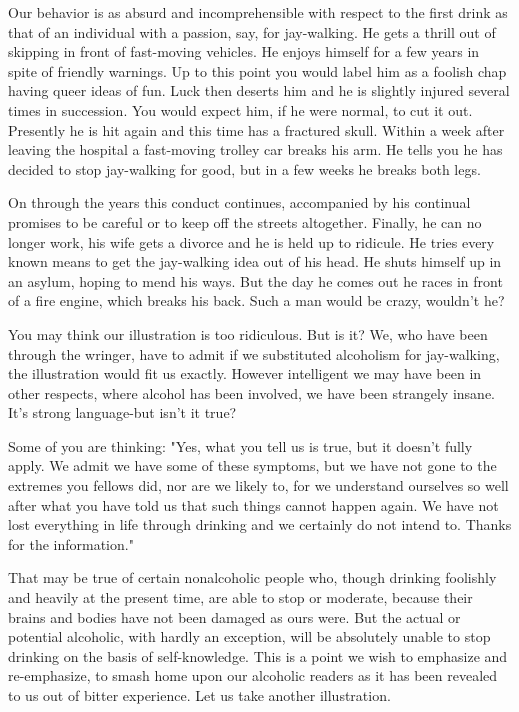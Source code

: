 \begin{biblechapter}
    Our behavior is as absurd and incomprehensible 
    with respect to the first drink 
    as that of an individual with a passion, say, for jay-walking. 
\verse He gets a thrill out of skipping in front of fast-moving vehicles. 
\verse He enjoys himself for a few years in spite of friendly warnings. 
\verse Up to this point you would label him as a foolish chap 
    having queer ideas of fun. 
\verse Luck then deserts him 
    and he is slightly injured several times in succession. 
\verse You would expect him, if he were normal, to cut it out. 
\verse Presently he is hit again and this time has a fractured skull. 
\verse Within a week after leaving the hospital 
    a fast-moving trolley car breaks his arm. 
\verse He tells you he has decided to stop jay-walking for good, 
    but in a few weeks he breaks both legs.

\verse On through the years this conduct continues, 
    accompanied by his continual promises to be careful 
    or to keep off the streets altogether. 
\verse Finally, he can no longer work, 
    his wife gets a divorce and he is held up to ridicule. 
\verse He tries every known means 
    to get the jay-walking idea out of his head. 
\verse He shuts himself up in an asylum, hoping to mend his ways. 
\verse But the day he comes out he races in front of a fire engine, 
    which breaks his back. 
\verse Such a man would be crazy, wouldn't he?

\verse You may think our illustration is too ridiculous. 
\verse But is it? 
\verse We, who have been through the wringer, 
    have to admit if we substituted alcoholism for jay-walking, 
    the illustration would fit us exactly. 
\verse However intelligent we may have been in other respects, 
    where alcohol has been involved, we have been strangely insane. 
\verse It's strong language-but isn't it true?
\end{biblechapter}


\begin{biblechapter}
    Some of you are thinking: 
\verse "Yes, what you tell us is true, but it doesn't fully apply. 
\verse We admit we have some of these symptoms, 
    but we have not gone to the extremes you fellows did, 
    nor are we likely to, 
    for we understand ourselves so well after what you have told us 
    that such things cannot happen again. 
\verse We have not lost everything in life through drinking 
    and we certainly do not intend to. 
\verse Thanks for the information."

\verse That may be true of certain nonalcoholic people who, 
    though drinking foolishly and heavily at the present time, 
    are able to stop or moderate, 
    because their brains and bodies have not been damaged as ours were. 
\verse But the actual or potential alcoholic, 
    with hardly an exception, 
    will be absolutely unable to stop drinking 
    on the basis of self-knowledge. 
\verse This is a point we wish to emphasize and re-emphasize, 
    to smash home upon our alcoholic readers 
    as it has been revealed to us out of bitter experience. 
\verse Let us take another illustration.
\end{biblechapter}


